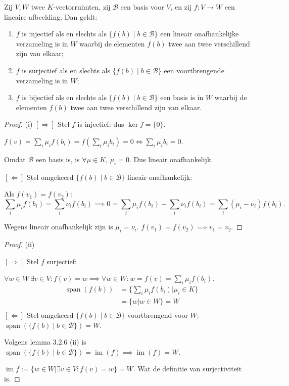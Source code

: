 \begin{stelling}[3.3.1]
    Zij $V, W$ twee $K$-vectorruimten, zij $\mathcal{B}$ een basis voor $V$, en zij $f \colon V \to W$ een lineaire afbeelding. Dan geldt:
    \begin{enumerate}
        \item[(i)] $f$ is injectief als en slechts als $\{f(b) \mid b \in \mathcal{B}\}$ een lineair onafhankelijke verzameling is in $W$ waarbij de elementen $f(b)$ twee aan twee verschillend zijn van elkaar;
        \item[(ii)] $f$ is surjectief als en slechts als $\{f(b) \mid b \in \mathcal{B}\}$ een voortbrengende verzameling is in $W$;
        \item[(iii)] $f$ is bijectief als en slechts als $\{f(b) \mid b \in \mathcal{B}\}$ een basis is in $W$ waarbij de elementen $f(b)$ twee aan twee verschillend zijn van elkaar.
    \end{enumerate}
\end{stelling}
\begin{proof}(i)
    \([\Rightarrow]\) Stel \(f\) is injectief: dus \(\ker f = \{0\}\).

     \(f(v) = \sum_i \mu_i f(b_i) = f(\sum_i \mu_i b_i) =0 \iff \sum_i \mu_i b_i = 0.\)

     Omdat \(\mathcal{B}\) een basis is, is \(\forall \mu \in K, \, \mu_i = 0\). Dus lineair onafhankelijk.

    \([\Leftarrow]\) Stel omgekeerd \(\{f(b) \mid b \in \mathcal{B}\}\) lineair onafhankelijk:

    Als \(f(v_1) = f(v_2)\):
    \[
        \sum_{i} \mu_i f(b_i) = \sum_{i} \nu_i f(b_i)
        \implies 0= \sum_{i} \mu_i f(b_i) - \sum_{i} \nu_i f(b_i)
        = \sum_{i} \left( \mu_i  -  \nu_i \right) f(b_i).
    \]

    Wegens lineair onafhankelijk zijn is \(\mu_i = \nu_i\).
    \(  f(v_1) = f(v_2)  \implies v_1 = v_2\).
\end{proof}
\begin{proof}(ii)

     \([\Rightarrow]\) Stel \(f\) surjectief:

     \(\forall w \in W \, \exists v \in V: f(v) = w
     \implies \forall w \in W: w = f(v) = \sum_{i} \mu_i f(b_i)\).
     \begin{align*}
        \operatorname{span}(f(b))
        &= \{\sum_{i} \mu_i f(b_i) | \mu_i \in K\}\\
        &= \{w | w \in W\} = W\\
     \end{align*}
    \([\Leftarrow]\) Stel omgekeerd \(\{f(b) \mid b \in \mathcal{B}\}\) voortbrengend voor \(W\):
    \(
    \operatorname{span}(\{f(b)\mid b \in \mathcal{B}\}) = W.
    \)

    Volgens lemma 3.2.6 (ii) is \(\operatorname{span}(\{f(b)\mid b \in \mathcal{B}\}) = \operatorname{im}(f)\implies \operatorname{im}(f) =W\).

    \(\operatorname{im}f := \{w \in W | \exists v \in V: f(v) = w\} = W\).
     Wat de definitie van surjectiviteit is.
\end{proof}
